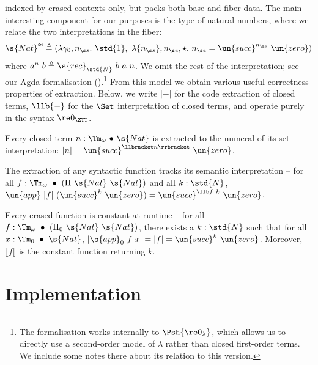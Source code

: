 \documentclass[a4paper,UKenglish,cleveref,autoref,thm-restate]{lipics-v2021}
\begin{document}
indexed by erased contexts only, but packs both base and fiber data. The main
interesting component for our purposes is the type of natural numbers, where we
relate the two interpretations in the fiber: 
$$
\s{Nat}^{\approx} \triangleq (\lambda \gamma_0,n_{\s s}.\
\std{1},\ \lambda \{n_{\s s}\}, n_{\s e},\star.\ n_{\s e} = \un{succ}^{n_{\s
s}}\ \un{zero})
$$
where $a^n\ b \triangleq \s{rec}_{\std{N}}\ b\ a\ n$. We omit
the rest of the interpretation; see our Agda formalisation ().\footnote{The formalisation works internally to $\Psh{\re 0_\lambda}$, which allows us
to directly use a second-order model of $\lambda$ rather than closed first-order terms. We include some
notes there about its relation to this version.}
From this model we obtain various useful correctness properties of extraction. Below,
we write $|-|$ for the code extraction of closed terms, $\llb{-}$ for the $\Set$ interpretation
of closed terms, and operate purely in the syntax $\re 0_{\ZTT}$.

\begin{theorem}\label{thm:canon}
  Every closed term $n : \Tm_\omega\ {\bullet}\ \s{Nat}$ is extracted to the numeral of
  its set interpretation: $|n| = \un{succ}^{\llbracket n \rrbracket}\ \un{zero}$.
\end{theorem}

\begin{theorem}\label{thm:track}
  The extraction of any syntactic function tracks its semantic
  interpretation -- for all $f : \Tm_\omega\ \bullet\ (\Pi\ \s{Nat}\ \s{Nat})$ and all $k : \std{N}$,
  $\un{app}\ |f|\ (\un{succ}^k\ \un{zero}) = \un{succ}^{\llb f \ k}\ \un{zero}$.
\end{theorem}

\begin{theorem}\label{thm:non-inter}
  Every erased function is constant at runtime -- for all $f : \Tm_\omega\ \bullet\ (\Pi_0\ \s{Nat}\ \s{Nat})$, there exists a $k : \std{N}$ such that for all $x : \Tm_0\ \bullet\ \s{Nat}$,
  $|\s{app}_0\ f\ x | = | f | = \un{succ}^k\ \un{zero}$.
  Moreover, $\llbracket f \rrbracket$ is the constant function returning $k$.
\end{theorem}

\section{Implementation} \label{sec:implementation}
\end{document}
